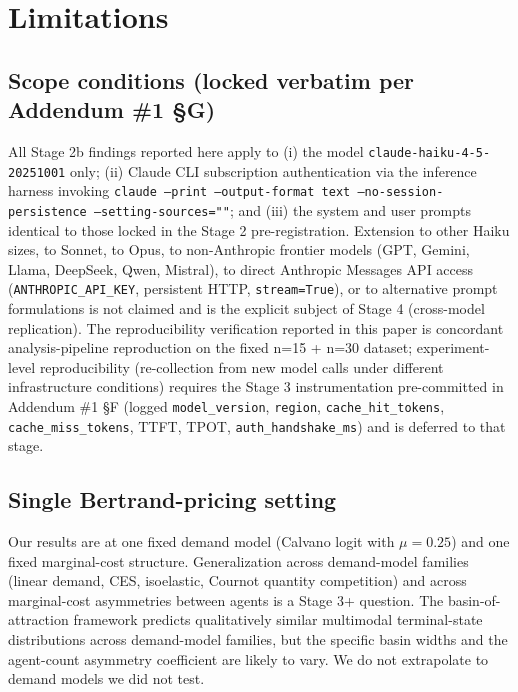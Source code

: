 \section{Limitations}
\label{sec:limitations}

\subsection{Scope conditions (locked verbatim per Addendum \#1 \S G)}
\label{sec:limitations-scope}

All Stage 2b findings reported here apply to (i) the model \texttt{claude-haiku-4-5-20251001} only; (ii) Claude CLI subscription authentication via the inference harness invoking \texttt{claude --print --output-format text --no-session-persistence --setting-sources=""}; and (iii) the system and user prompts identical to those locked in the Stage 2 pre-registration. Extension to other Haiku sizes, to Sonnet, to Opus, to non-Anthropic frontier models (GPT, Gemini, Llama, DeepSeek, Qwen, Mistral), to direct Anthropic Messages API access (\texttt{ANTHROPIC\_API\_KEY}, persistent HTTP, \texttt{stream=True}), or to alternative prompt formulations is not claimed and is the explicit subject of Stage 4 (cross-model replication). The reproducibility verification reported in this paper is concordant analysis-pipeline reproduction on the fixed n=15 + n=30 dataset; experiment-level reproducibility (re-collection from new model calls under different infrastructure conditions) requires the Stage 3 instrumentation pre-committed in Addendum \#1 \S F (logged \texttt{model\_version}, \texttt{region}, \texttt{cache\_hit\_tokens}, \texttt{cache\_miss\_tokens}, TTFT, TPOT, \texttt{auth\_handshake\_ms}) and is deferred to that stage.

\subsection{Single Bertrand-pricing setting}
\label{sec:limitations-bertrand}

Our results are at one fixed demand model (Calvano logit with $\mu = 0.25$) and one fixed marginal-cost structure. Generalization across demand-model families (linear demand, CES, isoelastic, Cournot quantity competition) and across marginal-cost asymmetries between agents is a Stage 3+ question. The basin-of-attraction framework predicts qualitatively similar multimodal terminal-state distributions across demand-model families, but the specific basin widths and the agent-count asymmetry coefficient are likely to vary. We do not extrapolate to demand models we did not test.

